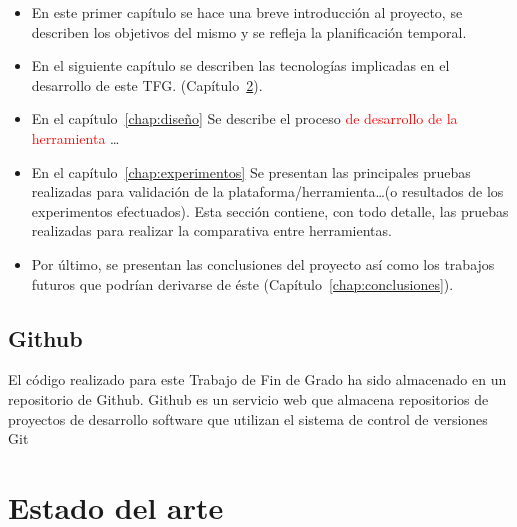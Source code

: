 \documentclass[a4paper, 12pt]{book}
\begin{document}
    \begin{itemize}
      \item En este primer capítulo se hace una breve introducción al proyecto, se describen los objetivos del mismo y se refleja la planificación temporal.
      \item En el siguiente capítulo se describen las tecnologías implicadas en el desarrollo de este TFG. (Capítulo~\ref{chap:tecnologias}).
      \item En el capítulo~\ref{chap:diseño} Se describe el proceso \textcolor{red}{de desarrollo
      de la herramienta}  \ldots
      \item En el capítulo~\ref{chap:experimentos} Se presentan las principales pruebas realizadas
      para validación de la plataforma/herramienta\ldots (o resultados de los experimentos
      efectuados). Esta sección contiene, con todo detalle, las pruebas realizadas para realizar la comparativa entre herramientas.
      \item Por último, se presentan las conclusiones del proyecto así como los trabajos futuros que podrían derivarse de éste (Capítulo~\ref{chap:conclusiones}).
    \end{itemize}


\section{Github}
\label{sec:planificacion-temporal}

El código realizado para este Trabajo de Fin de Grado ha sido almacenado en un repositorio de Github. Github es un servicio web que almacena repositorios de proyectos de
desarrollo software que utilizan el sistema de control de versiones Git

\clearpage


\chapter{Estado del arte}               %
\label{chap:tecnologias}
\end{document}
